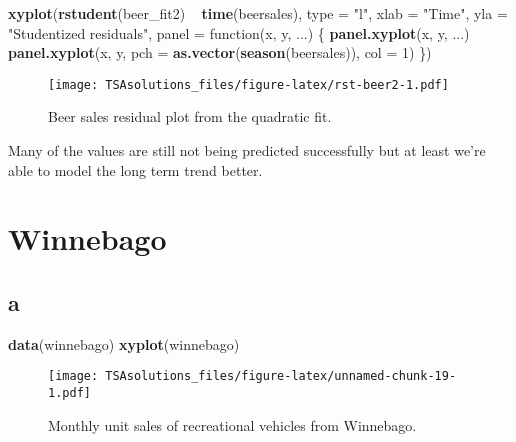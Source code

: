 \documentclass[]{book}
\newenvironment{Shaded}{\begin{snugshade}}{\end{snugshade}}
\newcommand{\KeywordTok}[1]{\textcolor[rgb]{0.13,0.29,0.53}{\textbf{{#1}}}}
\newcommand{\DataTypeTok}[1]{\textcolor[rgb]{0.13,0.29,0.53}{{#1}}}
\newcommand{\DecValTok}[1]{\textcolor[rgb]{0.00,0.00,0.81}{{#1}}}
\newcommand{\StringTok}[1]{\textcolor[rgb]{0.31,0.60,0.02}{{#1}}}
\newcommand{\NormalTok}[1]{{#1}}
\theoremstyle{definition}
\theoremstyle{definition}
\theoremstyle{remark}
\begin{document}
\begin{Shaded}
\begin{Highlighting}[]
\KeywordTok{xyplot}\NormalTok{(}\KeywordTok{rstudent}\NormalTok{(beer_fit2) ~}\StringTok{ }\KeywordTok{time}\NormalTok{(beersales), }\DataTypeTok{type =} \StringTok{"l"}\NormalTok{,}
       \DataTypeTok{xlab =} \StringTok{"Time"}\NormalTok{, }\DataTypeTok{yla =} \StringTok{"Studentized residuals"}\NormalTok{,}
       \DataTypeTok{panel =} \NormalTok{function(x, y, ...) \{}
         \KeywordTok{panel.xyplot}\NormalTok{(x, y, ...)}
         \KeywordTok{panel.xyplot}\NormalTok{(x, y, }\DataTypeTok{pch =} \KeywordTok{as.vector}\NormalTok{(}\KeywordTok{season}\NormalTok{(beersales)), }\DataTypeTok{col =} \DecValTok{1}\NormalTok{)}
       \NormalTok{\})}
\end{Highlighting}
\end{Shaded}

\begin{figure}[htbp]
\centering
\texttt{[image: TSAsolutions\_files/figure-latex/rst-beer2-1.pdf]}
\caption{\label{fig:rst-beer2}Beer sales residual plot from the quadratic
fit.}
\end{figure}

Many of the values are still not being predicted successfully but at
least we're able to model the long term trend better.

\section{Winnebago}\label{winnebago}

\subsection*{a}\label{a-24}

\begin{Shaded}
\begin{Highlighting}[]
\KeywordTok{data}\NormalTok{(winnebago)}
\KeywordTok{xyplot}\NormalTok{(winnebago)}
\end{Highlighting}
\end{Shaded}

\begin{figure}[htbp]
\centering
\texttt{[image: TSAsolutions\_files/figure-latex/unnamed-chunk-19-1.pdf]}
\caption{\label{fig:unnamed-chunk-19}Monthly unit sales of recreational
vehicles from Winnebago.}
\end{figure}
\end{document}
